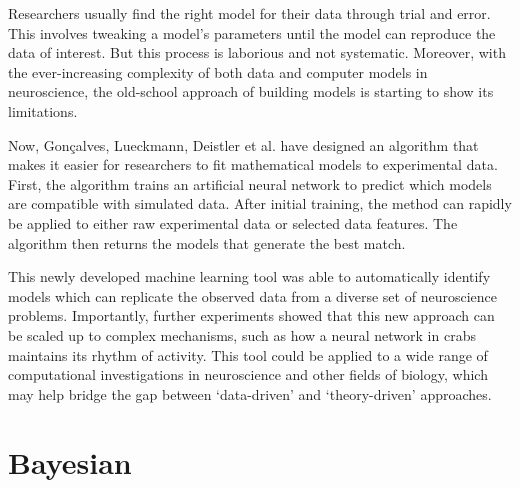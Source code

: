 Researchers usually find the right model for their data through trial and error. This involves tweaking a model’s parameters until the model can reproduce the data of interest. But this process is laborious and not systematic. Moreover, with the ever-increasing complexity of both data and computer models in neuroscience, the old-school approach of building models is starting to show its limitations.

Now, Gonçalves, Lueckmann, Deistler et al. have designed an algorithm that makes it easier for researchers to fit mathematical models to experimental data. First, the algorithm trains an artificial neural network to predict which models are compatible with simulated data. After initial training, the method can rapidly be applied to either raw experimental data or selected data features. The algorithm then returns the models that generate the best match.

This newly developed machine learning tool was able to automatically identify models which can replicate the observed data from a diverse set of neuroscience problems. Importantly, further experiments showed that this new approach can be scaled up to complex mechanisms, such as how a neural network in crabs maintains its rhythm of activity. This tool could be applied to a wide range of computational investigations in neuroscience and other fields of biology, which may help bridge the gap between ‘data-driven’ and ‘theory-driven’ approaches.

\section{Bayesian}






